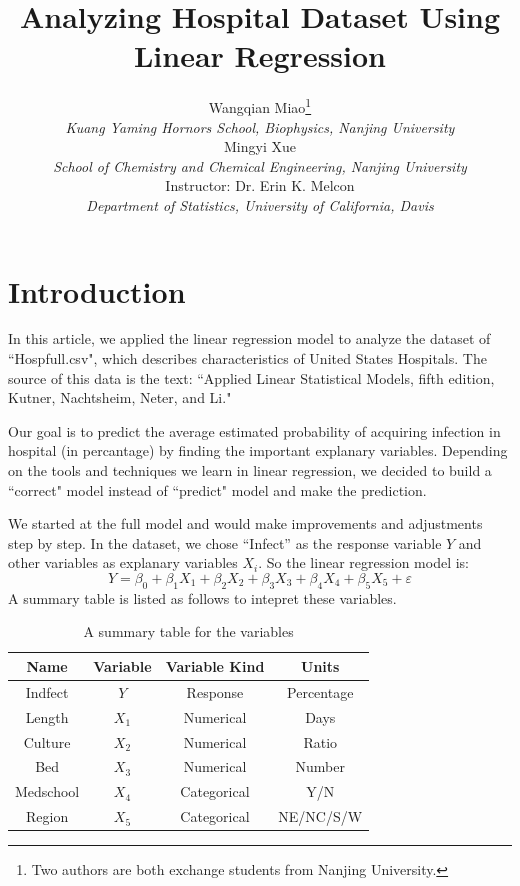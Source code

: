 \documentclass[a4paper,11pt,onecolumn,twoside]{article}
\title{\Large \textbf{Analyzing Hospital Dataset Using Linear Regression }}
\author{
Wangqian Miao\footnote{Two authors are both exchange students from Nanjing University.}
\\[2pt]
{\large \textit{Kuang Yaming Hornors School, Biophysics, Nanjing University}}\\[6pt]
Mingyi Xue\\[2pt]
{\large \textit{School of Chemistry and Chemical Engineering, Nanjing University}}\\[6pt]
Instructor: Dr. Erin K. Melcon\\[2pt]
{\large \textit{Department of Statistics, University of California, Davis}}\\[2pt]
}
\date{}
\begin{document}
\maketitle
\thispagestyle{firststyle}
\setlength{\oddsidemargin}{ 1cm}
\setlength{\evensidemargin}{\oddsidemargin}
\setlength{\textwidth}{15.50cm}
\vspace{-.8cm}
\setcounter{page}{1}
\setlength{\oddsidemargin}{-.5cm}  %
\setlength{\evensidemargin}{\oddsidemargin}
\setlength{\textwidth}{17.00cm}
\tableofcontents
\newpage
\section{Introduction}
In this article, we applied the linear regression model to analyze the dataset of ``Hospfull.csv", which describes characteristics of United States Hospitals.
The source of this data is the text: ``Applied Linear Statistical Models, fifth edition, Kutner, Nachtsheim, Neter,
and Li."\par
Our goal is to predict the average estimated probability of acquiring infection in hospital (in percantage) by finding the important explanary variables. Depending on the tools and techniques we learn in linear regression, we decided to build a ``correct" model instead of ``predict" model and make the prediction. \par
We started at the full model and would make improvements and adjustments step by step. In the dataset,
we chose ``Infect'' as the response variable $Y$ and other variables as explanary variables $X_i$. So the linear regression model is:
\begin{equation}
Y=\beta_0+\beta_1X_1+\beta_2X_2+\beta_3X_3+\beta_4X_4+\beta_5X_5+\varepsilon
\end{equation}
A summary table is listed as follows to intepret these variables. 
\begin{table}[htbp]
 	\centering
 	\begin{tabular}{cccc}
 		\midrule[1.5pt]
 		Name& Variable &Variable Kind  & Units\\
 		\hline
 		Indfect&$Y$ & Response  & Percentage\\
 	    Length& $X_1$& Numerical  & Days  \\
 		 Culture& $X_2$ &Numerical & Ratio \\
 		 Bed& $X_3$ & Numerical& Number \\
 		 Medschool&$X_4$& Categorical  & Y/N \\
 		Region& $X_5$& Categorical  & NE/NC/S/W \\
 		\midrule[1.5pt]
 	\end{tabular}
 	\caption{A summary table for the variables }
\end{table}
\end{document}

